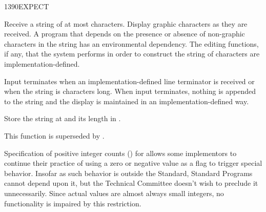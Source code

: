 \begin{worddef}{1390}{EXPECT}
\item {}

	Receive a string of at most  characters. Display graphic
	characters as they are received. A program that depends on
	the presence or absence of non-graphic characters in the
	string has an environmental dependency. The editing functions,
	if any, that the system performs in order to construct the
	string of characters are implementation-defined.

	Input terminates when an implementation-defined line terminator
	is received or when the string is  characters long. When
	input terminates, nothing is appended to the string and the
	display is maintained in an implementation-defined way.

	Store the string at  and its length in .

\note
	This function is superseded by .

	\begin{rationale} %
		Specification of positive integer counts () for
		 allows some implementors to continue their
		practice of using a zero or negative value as a flag to
		trigger special behavior. Insofar as such behavior is outside
		the Standard, Standard Programs cannot depend upon it, but
		the Technical Committee doesn't wish to preclude it
		unnecessarily. Since actual values are almost always small
		integers, no functionality is impaired by this restriction.
	\end{rationale}
\end{worddef}


